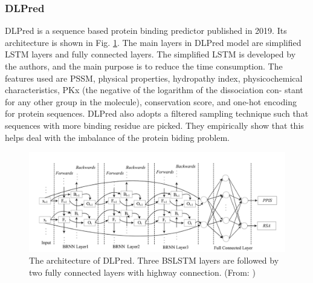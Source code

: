 \subsubsection{DLPred}
DLPred \cite{zhang2019sequence} is a sequence based protein binding predictor published in 2019. Its architecture is shown in Fig. \ref{fig_DLPred}. The main layers in DLPred model are simplified LSTM layers and fully connected layers. The simplified LSTM is developed by the authors, and the main purpose is to reduce the time consumption. The features used are PSSM, physical properties, hydropathy index, physicochemical characteristics, PKx (the negative of the logarithm of the dissociation con- stant for any other group in the molecule), conservation score, and one-hot encoding for protein sequences. DLPred also adopts a filtered sampling technique such that sequences with more binding residue are picked. They empirically show that this helps deal with the imbalance of the protein biding problem.
\begin{figure}[h!]
\begin{center}
\includegraphics[height = 6 cm]{img/DLPred.png}
\caption{The architecture of DLPred. Three BSLSTM layers are followed by two fully connected layers with highway connection.  (From: \cite{zhang2019sequence})  \label{fig_DLPred}}
\end{center}
\end{figure} 

